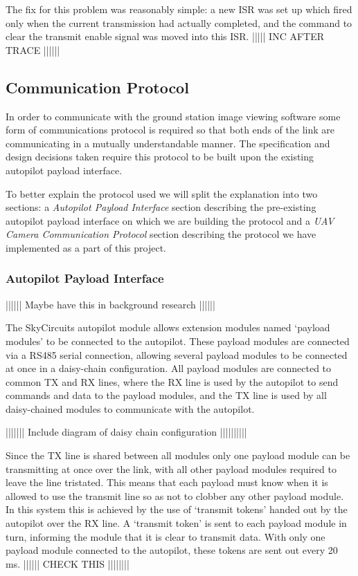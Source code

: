 The fix for this problem was reasonably simple: a new ISR was set up which 
fired only when the current transmission had actually completed, and the 
command to clear the transmit enable signal was moved into this ISR.
||||| INC AFTER TRACE ||||||


\subsection{Communication Protocol}
In order to communicate with the ground station image viewing software some
form of communications protocol is required so that both ends of the link 
are communicating in a mutually understandable manner. The specification and 
design decisions taken require this protocol to be built upon the existing
autopilot payload interface.

To better explain the protocol used we will split the explanation into two 
sections: a \emph{Autopilot Payload Interface} section describing the
pre-existing autopilot payload interface on which we are building the 
protocol and a \emph{UAV Camera Communication Protocol} section describing the 
protocol we have implemented as a part of this project.

\subsubsection{Autopilot Payload Interface}
|||||| Maybe have this in background research ||||||

The SkyCircuits autopilot module allows extension modules named `payload 
modules' to be connected to the autopilot. These payload modules are connected 
via a RS485 serial connection, allowing several payload modules to be 
connected at once in a daisy-chain configuration. All payload modules are 
connected to common TX and RX lines, where the RX line is used by the
autopilot to send commands and data to the payload modules, and the TX
line is used by all daisy-chained modules to communicate with the autopilot.

||||||| Include diagram of daisy chain configuration ||||||||||

Since the TX line is shared between all modules only one payload module can be 
transmitting at once over the link, with all other payload modules required to
leave the line tristated. This means that each payload must know when it is
allowed to use the transmit line so as not to clobber any other payload module.
In this system this is achieved by the use of `transmit tokens' handed out 
by the autopilot over the RX line. A `transmit token' is sent to each payload 
module in turn, informing the module that it is clear to transmit data. With 
only one payload module connected to the autopilot, these tokens are sent out 
every 20 ms. |||||| CHECK THIS ||||||||

